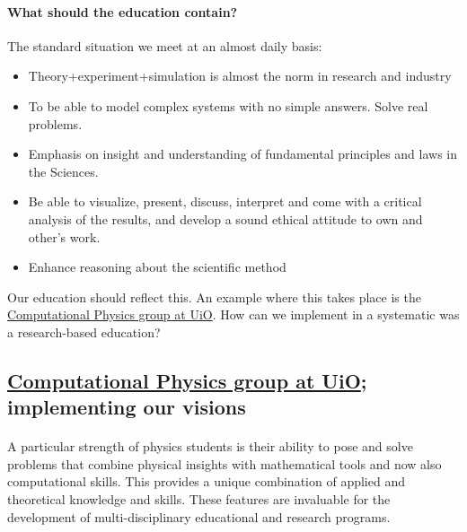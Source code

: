 \documentclass[%
oneside,                 %
final,                   %
10pt]{article}
\begin{document}
\paragraph{What should the education contain?}
The standard situation we meet at an almost daily basis:

\begin{itemize}
\item Theory+experiment+simulation is almost the norm in research and industry

\item To be able to model complex systems with no simple answers. Solve real problems.

\item Emphasis on insight and understanding of fundamental principles and laws in the Sciences.

\item Be able to visualize, present, discuss, interpret and come with a critical analysis of the results, and develop a sound ethical attitude to own and other's work.

\item Enhance reasoning about the scientific method
\end{itemize}

\noindent
Our education should reflect this. An example where this takes place is the \href{{http://www.mn.uio.no/fysikk/english/research/groups/computational/index.html}}{Computational Physics group at UiO}.  How can we implement in a systematic was a research-based education?




\subsection*{\href{{http://www.mn.uio.no/fysikk/english/research/groups/computational/index.html}}{Computational Physics group at UiO}; implementing our visions}

\paragraph{}
A particular strength of physics students is their ability to pose and
solve problems that combine physical insights with mathematical tools
and now also computational skills. This provides a unique combination
of applied and theoretical knowledge and skills. These features are invaluable 
for the development of multi-disciplinary educational and research programs.
\end{document}
